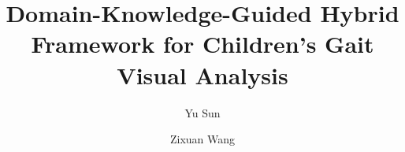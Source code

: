 \documentclass[10pt,twocolumn,letterpaper]{article}
\title{Domain-Knowledge-Guided Hybrid Framework for Children's Gait Visual Analysis}
\author[1]{Yu Sun}
\author[2]{Zixuan Wang}
\affil[1]{University of Pennsylvania}
\affil[2]{University of California, San Diego}
\date{}
\begin{document}
\maketitle






{
    \small
    
    
}
\end{document}
